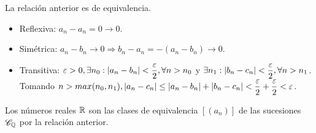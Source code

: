 \clearpage

\begin{prop}
  La relación anterior es de equivalencia. \begin{itemize}
    \item Reflexiva: $a_n - a_n = 0 \to 0$.
    \item Simétrica: $a_n - b_n \to 0 \Rightarrow b_n - a_n = -(a_n-b_n) \to 0$.
    \item Transitiva: $\varepsilon > 0, \exists n_0 : |a_n - b_n| < \dfrac{\varepsilon}{2}, \forall n > n_0$
          y $\exists n_1 : |b_n - c_n| < \dfrac{\varepsilon}{2}, \forall n > n_1$. Tomando $n > max(n_0, n_1), |a_n - c_n| \leq |a_n - b_n| + |b_n - c_n| < \dfrac{\varepsilon}{2} + \dfrac{\varepsilon}{2} < \varepsilon$.
  \end{itemize}
\end{prop}

\begin{definition}
  Los números reales $\mathbb{R}$ son las clases de equivalencia $[(a_n)]$ de las sucesiones $\mathscr{C}_{\mathbb{Q}}$ por la relación anterior.
\end{definition}
